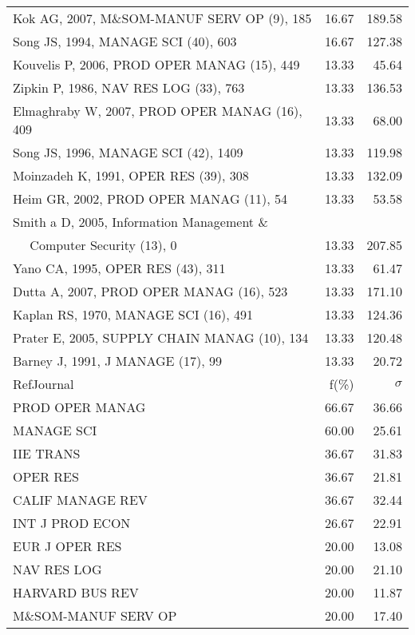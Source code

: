 \documentclass[a4paper,11pt]{report}
\begin{document}
\begin{landscape}
\begin{table}[!ht]
{\begin{tabular}{|l r r|}
Kok AG, 2007, M\&SOM-MANUF SERV OP (9), 185 & 16.67 & 189.58\\
Song JS, 1994, MANAGE SCI (40), 603 & 16.67 & 127.38\\
Kouvelis P, 2006, PROD OPER MANAG (15), 449 & 13.33 & 45.64\\
Zipkin P, 1986, NAV RES LOG (33), 763 & 13.33 & 136.53\\
Elmaghraby W, 2007, PROD OPER MANAG (16), 409 & 13.33 & 68.00\\
Song JS, 1996, MANAGE SCI (42), 1409 & 13.33 & 119.98\\
Moinzadeh K, 1991, OPER RES (39), 308 & 13.33 & 132.09\\
Heim GR, 2002, PROD OPER MANAG (11), 54 & 13.33 & 53.58\\
Smith a D, 2005, Information Management \& &  & \\
$\quad$ Computer Security (13), 0 & 13.33 & 207.85\\
Yano CA, 1995, OPER RES (43), 311 & 13.33 & 61.47\\
Dutta A, 2007, PROD OPER MANAG (16), 523 & 13.33 & 171.10\\
Kaplan RS, 1970, MANAGE SCI (16), 491 & 13.33 & 124.36\\
Prater E, 2005, SUPPLY CHAIN MANAG (10), 134 & 13.33 & 120.48\\
Barney J, 1991, J MANAGE (17), 99 & 13.33 & 20.72\\
\hline
\hline
RefJournal & f(\%) & $\sigma$\\
\hline
PROD OPER MANAG & 66.67 & 36.66\\
MANAGE SCI & 60.00 & 25.61\\
IIE TRANS & 36.67 & 31.83\\
OPER RES & 36.67 & 21.81\\
CALIF MANAGE REV & 36.67 & 32.44\\
INT J PROD ECON & 26.67 & 22.91\\
EUR J OPER RES & 20.00 & 13.08\\
NAV RES LOG & 20.00 & 21.10\\
HARVARD BUS REV & 20.00 & 11.87\\
M\&SOM-MANUF SERV OP & 20.00 & 17.40\\
\hline
\end{tabular}
}
\end{table}

\clearpage


\end{landscape}
\end{document}
